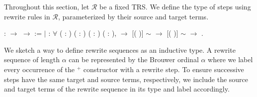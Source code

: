 Throughout this section, let $\mathcal{R}$ be a fixed TRS. We define the type
of steps using rewrite rules in $\mathcal{R}$, parameterized by their source
and target terms.
\begin{singlespace}
\begin{coqdoccode}
\coqdocnoindent
{}  :
 \ensuremath{\rightarrow}
 \ensuremath{\rightarrow}
 :=\coqdoceol
\coqdocindent{1.00em}
\ensuremath{|}  :
\ensuremath{\forall} (  :
) (\coqdocvar{$\rho$} :
) ( :
) (\coqdocvar{$\sigma$} :
),\coqdoceol
\coqdocindent{6.50em} \coqdocvariable{$\rho$}
 \ensuremath{\rightarrow}\coqdoceol
\coqdocindent{6.50em}
[(
\coqdocvariable{$\rho$})\coqdocvariable{$^\sigma$}] $\sim$ 
\ensuremath{\rightarrow}\coqdoceol
\coqdocindent{6.50em}
[(
\coqdocvariable{$\rho$})\coqdocvariable{$^\sigma$}] $\sim$ 
\ensuremath{\rightarrow}\coqdoceol
\coqdocindent{6.50em}
 
.\coqdoceol
\end{coqdoccode}
\end{singlespace}
We sketch a way to define rewrite sequences as an inductive type. A rewrite
sequence of length $\alpha$ can be represented by the Brouwer ordinal $\alpha$
where we label every occurrence of the $^+$ constructor with a rewrite
step. To ensure successive steps have the same target and source terms,
respectively, we include the source and target terms of the rewrite sequence
in its type and label accordingly.

